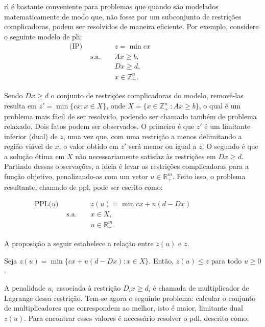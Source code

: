 \gls{rl}  é  bastante  conveniente   para  problemas  que  quando  são
modelados matematicamente de modo que, não fosse por um subconjunto de
restrições   complicadoras,   podem    ser   resolvidos   de   maneira
eficiente. Por exemplo, considere o seguinte modelo de \gls{pli}:
\begin{align*}
    \text{(IP) } & & & z = \min cx & & & & & & & & \\
    &\text{s.a. } & & Ax \geq b, & & & & & & & & \\
    & & & Dx \geq d, & & & & & & & & \\
    & & & x \in \mathbb{Z}^n_+. & & & & & & & &
\end{align*}

Sendo $Dx  \geq d$ o  conjunto de restrições complicadoras  do modelo,
removê-las resulta em $z' = \min \{cx :  x \in X\}$, onde $X = \{x \in
\mathbb{Z}^n_+\ : Ax \geq b\}$, o qual é um problema mais fácil de ser
resolvido,  podendo ser  chamado  também de  problema relaxado.   Dois
fatos  podem ser  observados. O  primeiro é  que $z'$  é um  limitante
inferior  (dual) de  $z$,  uma  vez que,  com  uma  restrição a  menos
delimitando a região viável de $x$,  o valor obtido em $z'$ será menor
ou  igual  a  $z$.  O  segundo  é  que  a  solução ótima  em  $X$  não
necessariamente  satisfaz  às restrições  em  $Dx  \geq d$.   Partindo
dessas observações, a ideia é levar as restrições complicadoras para a
função objetivo, penalizando-as com um vetor $u \in \mathbb{R}^{m}_+$.
Feito  isso, o  problema resultante,  chamado de  \gls{ppl}, pode  ser
escrito como:

\begin{align*}
    \text{PPL($u$) } & & & z(u) = \min cx  + u(d - Dx) & & & & & & & \\
    & \text{s.a. } & & x \in X, & & & & & & & \\
    & & & u \in \mathbb{R}^m_+. & & & & & & &
\end{align*}

A proposição a seguir estabelece a relação entre $z(u)$ e $z$.
\begin{proposition}
Seja $z(u) = \min \{cx  + u (d - Dx) : x \in  X\} $. Então, $z(u) \leq
z$ para todo $u \geq 0$.
\end{proposition}
A penalidade $u_i$ associada à restrição  $D_ix \geq d_i$ é chamada de
multiplicador de  Lagrange dessa  restrição.  Tem-se agora  o seguinte
problema: calcular  o conjunto de multiplicadores  que correspondem ao
melhor, isto  é maior,  limitante dual  $z(u)$.  Para  encontrar esses
valores é necessário resolver o \gls{pdl}, descrito como:

